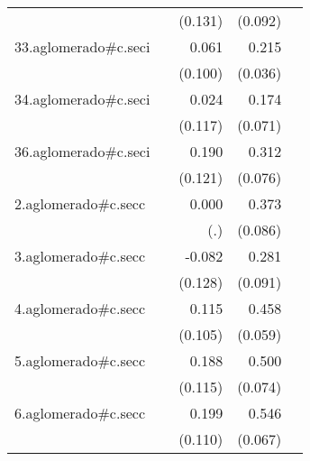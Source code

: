 {\begin{longtable}{l*{4}{D{.}{.}{-1}}}
            &                     &     (0.131)         &     (0.092)         &                     \\
\addlinespace
33.aglomerado#c.seci&                     &       0.061         &       0.215\sym{***}&                     \\
            &                     &     (0.100)         &     (0.036)         &                     \\
\addlinespace
34.aglomerado#c.seci&                     &       0.024         &       0.174\sym{*}  &                     \\
            &                     &     (0.117)         &     (0.071)         &                     \\
\addlinespace
36.aglomerado#c.seci&                     &       0.190         &       0.312\sym{***}&                     \\
            &                     &     (0.121)         &     (0.076)         &                     \\
\addlinespace
2.aglomerado#c.secc&                     &       0.000         &       0.373\sym{***}&                     \\
            &                     &         (.)         &     (0.086)         &                     \\
\addlinespace
3.aglomerado#c.secc&                     &      -0.082         &       0.281\sym{**} &                     \\
            &                     &     (0.128)         &     (0.091)         &                     \\
\addlinespace
4.aglomerado#c.secc&                     &       0.115         &       0.458\sym{***}&                     \\
            &                     &     (0.105)         &     (0.059)         &                     \\
\addlinespace
5.aglomerado#c.secc&                     &       0.188         &       0.500\sym{***}&                     \\
            &                     &     (0.115)         &     (0.074)         &                     \\
\addlinespace
6.aglomerado#c.secc&                     &       0.199         &       0.546\sym{***}&                     \\
            &                     &     (0.110)         &     (0.067)         &                     \\

\end{longtable}}
